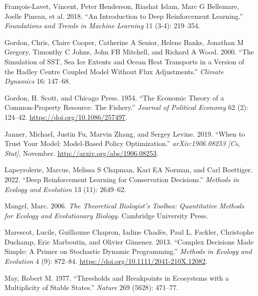 \documentclass{article}
\newlength{\cslhangindent}
\newlength{\cslentryspacingunit} %
\newenvironment{CSLReferences}[2] %
 {%
  \setlength{\parindent}{0pt}
  \ifodd #1
  \let\oldpar\par
  \def\par{\hangindent=\cslhangindent\oldpar}
  \fi
  \setlength{\parskip}{#2\cslentryspacingunit}
 }%
 {}
\begin{document}
\begin{CSLReferences}{1}{0}
\leavevmode{}%
François-Lavet, Vincent, Peter Henderson, Riashat Islam, Marc G
Bellemare, Joelle Pineau, et al. 2018. {``An Introduction to Deep
Reinforcement Learning.''} \emph{Foundations and Trends{\textregistered}
in Machine Learning} 11 (3-4): 219--354.

\leavevmode{}%
Gordon, Chris, Claire Cooper, Catherine A Senior, Helene Banks, Jonathan
M Gregory, Timonthy C Johns, John FB Mitchell, and Richard A Wood. 2000.
{``The Simulation of SST, Sea Ice Extents and Ocean Heat Transports in a
Version of the Hadley Centre Coupled Model Without Flux Adjustments.''}
\emph{Climate Dynamics} 16: 147--68.

\leavevmode{}%
Gordon, H. Scott, and Chicago Press. 1954. {``{The Economic Theory of a
Common-Property Resource: The Fishery}.''} \emph{Journal of Political
Economy} 62 (2): 124--42. \url{https://doi.org/10.1086/257497}.

\leavevmode{}%
Janner, Michael, Justin Fu, Marvin Zhang, and Sergey Levine. 2019.
{``When to {Trust} {Your} {Model}: {Model}-{Based} {Policy}
{Optimization}.''} \emph{arXiv:1906.08253 {[}Cs, Stat{]}}, November.
\url{http://arxiv.org/abs/1906.08253}.

\leavevmode{}%
Lapeyrolerie, Marcus, Melissa S Chapman, Kari EA Norman, and Carl
Boettiger. 2022. {``Deep Reinforcement Learning for Conservation
Decisions.''} \emph{Methods in Ecology and Evolution} 13 (11): 2649--62.

\leavevmode{}%
Mangel, Marc. 2006. \emph{The Theoretical Biologist's Toolbox:
Quantitative Methods for Ecology and Evolutionary Biology}. Cambridge
University Press.

\leavevmode{}%
Marescot, Lucile, Guillaume Chapron, Iadine Chadès, Paul L. Fackler,
Christophe Duchamp, Eric Marboutin, and Olivier Gimenez. 2013.
{``Complex Decisions Made Simple: A Primer on Stochastic Dynamic
Programming.''} \emph{Methods in Ecology and Evolution} 4 (9): 872--84.
\url{https://doi.org/10.1111/2041-210X.12082}.

\leavevmode{}%
May, Robert M. 1977. {``Thresholds and Breakpoints in Ecosystems with a
Multiplicity of Stable States.''} \emph{Nature} 269 (5628): 471--77.


\end{CSLReferences}
\end{document}
